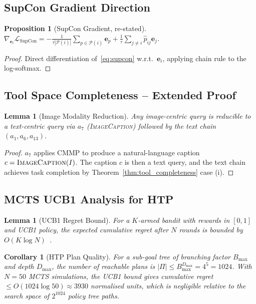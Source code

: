 \documentclass[10pt,conference]{IEEEtran}
\theoremstyle{ieeethm}
\newtheorem{lemma}[theorem]{Lemma}
\newtheorem{corollary}[theorem]{Corollary}
\newtheorem{proposition}[theorem]{Proposition}
\theoremstyle{ieeedef}
\theoremstyle{ieeeremark}
\begin{document}
\subsection{SupCon Gradient Direction}

\begin{proposition}[SupCon Gradient, re-stated]
\label{prop:supcon_grad}
$\nabla_{\mathbf{e}_i}\mathcal{L}_\text{SupCon} = -\frac{1}{\tau|\mathcal{P}(i)|}\sum_{p \in \mathcal{P}(i)}\mathbf{e}_p + \frac{1}{\tau}\sum_{j \neq i}\hat{p}_{ij}\mathbf{e}_j$.
\end{proposition}
\begin{proof}
Direct differentiation of~\eqref{eq:supcon} w.r.t.\ $\mathbf{e}_i$, applying chain rule to the log-softmax.
\end{proof}

\subsection{Tool Space Completeness -- Extended Proof}

\begin{lemma}[Image Modality Reduction]
\label{lem:image_reduce}
Any image-centric query is reducible to a text-centric query via $a_7$ (\textsc{ImageCaption}) followed by the text chain $(a_1, a_6, a_{13})$.
\end{lemma}
\begin{proof}
$a_7$ applies CMMP to produce a natural-language caption $c = \textsc{ImageCaption}(I)$. The caption $c$ is then a text query, and the text chain achieves task completion by Theorem~\ref{thm:tool_completeness} case (i).
\end{proof}

\subsection{MCTS UCB1 Analysis for HTP}

\begin{lemma}[UCB1 Regret Bound]
\label{lem:ucb1_regret}
For a $K$-armed bandit with rewards in $[0,1]$ and UCB1 policy, the expected cumulative regret after $N$ rounds is bounded by $O(K \log N)$~\cite{auer2002finite}.
\end{lemma}

\begin{corollary}[HTP Plan Quality]
\label{cor:htp_quality}
For a sub-goal tree of branching factor $B_\text{max}$ and depth $D_\text{max}$, the number of reachable plans is $|\Pi| \leq B_\text{max}^{D_\text{max}} = 4^5 = 1024$. With $N = 50$ MCTS simulations, the UCB1 bound gives cumulative regret $\leq O(1024 \log 50) \approx 3930$ normalised units, which is negligible relative to the search space of $2^{1024}$ policy tree paths.
\end{corollary}
\end{document}
